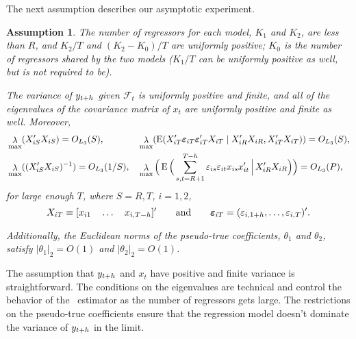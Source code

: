 \documentclass[11pt]{article}
\newcommand{\e}{\varepsilon}
\DeclareMathOperator{\eigen}{\lambda}
\newtheorem{asmp}{Assumption}
\begin{document}
The next assumption describes our asymptotic experiment.
\begin{asmp}\label{asmp-2}
  The number of regressors for each model, $K_1$ and $K_2$, are less
  than $R$, and $K_2/T$ and $(K_2-K_0)/T$ are uniformly positive;
  $K_0$ is the number of regressors shared by the two models ($K_1/T$
  can be uniformly positive as well, but is not required to be).

  The variance of $y_{t+h}$ given $\mathcal{F}_t$ is uniformly
  positive and finite, and all of the eigenvalues of the covariance
  matrix of $x_t$ are uniformly positive and finite as well.
  Moreover,
  \begin{align*}
    &\eigen_{\max}(X_{iS}'X_{iS}) = O_{L_3}(S),&
    &\eigen_{\max}(\E(X_{iT}'\ep{iT}\ep{iT}'X_{iT}
    \mid X_{iR}'X_{iR}, X_{iT}'X_{iT})) = O_{L_3}(S),\\
    &\eigen_{\max}((X_{iS}'X_{iS})^{-1}) = O_{L_3}(1/S),&
    &\eigen_{\max}\Big(\E\Big( \sum_{s,t=R+1}^{T-h} \e_{is} \e_{it} x_{is}x_{it}'
    \,\Big|\, X_{iR}'X_{iR} \Big)\Big) = O_{L_3}(P),
  \end{align*}
  for large enough $T$, where $S = R,T$, $i = 1,2$,
  \[ X_{iT} \equiv [x_{i1} \quad \dots \quad x_{i,T-\h}]' \qquad
  \text{and} \qquad \ep{iT} = (\e_{i,1+\h}, \dots, \e_{i,T})'.\]

  Additionally, the Euclidean norms of the pseudo-true coefficients,
  $\theta_1$ and $\theta_2$, satisfy $|\theta_1|_2 = O(1)$ and
  $|\theta_2|_2 = O(1)$.
\end{asmp}

The assumption that $y_{t+h}$ and $x_t$ have positive and finite
variance is straightforward.  The conditions on the eigenvalues are
technical and control the behavior of the \ols\ estimator as the
number of regressors gets large.  The restrictions on the pseudo-true
coefficients ensure that the regression model doesn't dominate the
variance of $y_{t+h}$ in the limit.
\end{document}
